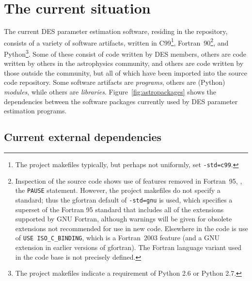 \documentclass[draftmode,draftwater]{memarticle}
\newcommand{\despipe}{\name{des-pipe}\xspace}
\begin{document}
\chapter{The current situation\label{ch:current_situation}}

The current DES parameter estimation software, residing in the
\despipe repository, consists of a variety of software
artifacts, written in C99\footnote{The project makefiles typically, but
  perhaps not uniformly, set \texttt{-std=c99}.},
Fortran~90\footnote{Inspection of the source code shows use of features
  removed in Fortran~95, \eg, the \texttt{PAUSE} statement. However, the
  project makefiles do not specify a standard; thus the gfortran default
  of \texttt{-std=gnu} is used, which specifies a superset of the
  Fortran 95 standard that includes all of the extensions supported by
  GNU Fortran, although warnings will be given for obsolete extensions
  not recommended for use in new code. Elsewhere in the code is use of
  \texttt{USE ISO\_C\_BINDING}, which is a Fortran~2003 feature (and a
  GNU extension in earlier versions of gfortran). The Fortran language
  variant used in the code base is not precisely defined.}, and
Python\footnote{The project makefiles indicate a requirement of Python
  2.6 or Python 2.7.}. Some of these consist of code written by DES
members, others are code written by others in the astrophysics
community, and others are code written by those outside the community,
but all of which have been imported into the \despipe source
code repository. Some software artifacts are \emph{programs}, others are
(Python) \emph{modules}, while others are \emph{libraries}.
Figure~\ref{fig:astropackages} shows the dependencies between the
software packages currently used by DES parameter estimation programs.

\section{Current external dependencies}
\end{document}
